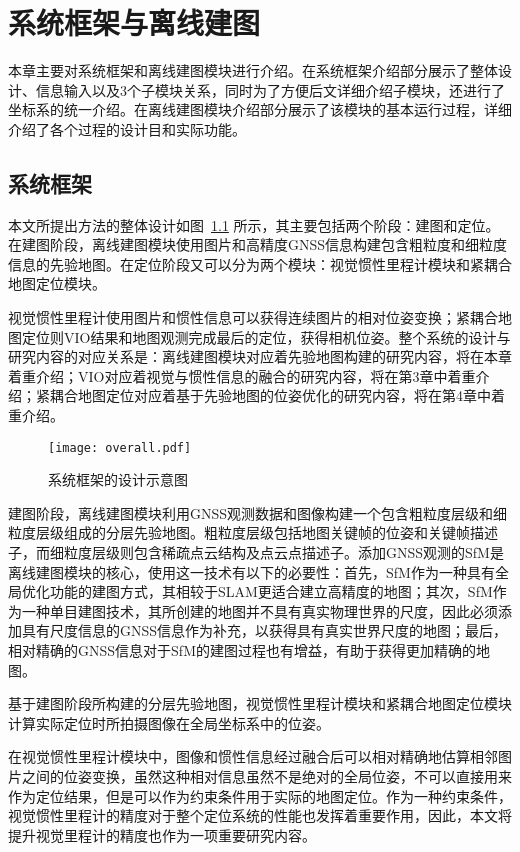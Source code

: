 
\chapter{系统框架与离线建图}

本章主要对系统框架和离线建图模块进行介绍。在系统框架介绍部分展示了整体设计、信息输入以及3个子模块关系，同时为了方便后文详细介绍子模块，还进行了坐标系的统一介绍。在离线建图模块介绍部分展示了该模块的基本运行过程，详细介绍了各个过程的设计目和实际功能。

\section{系统框架}

本文所提出方法的整体设计如图~\ref{fig:overall} 所示，其主要包括两个阶段：建图和定位。在建图阶段，离线建图模块使用图片和高精度GNSS信息构建包含粗粒度和细粒度信息的先验地图。在定位阶段又可以分为两个模块：视觉惯性里程计模块和紧耦合地图定位模块。

视觉惯性里程计使用图片和惯性信息可以获得连续图片的相对位姿变换；紧耦合地图定位则VIO结果和地图观测完成最后的定位，获得相机位姿。整个系统的设计与研究内容的对应关系是：离线建图模块对应着先验地图构建的研究内容，将在本章着重介绍；VIO对应着视觉与惯性信息的融合的研究内容，将在第3章中着重介绍；紧耦合地图定位对应着基于先验地图的位姿优化的研究内容，将在第4章中着重介绍。

\begin{figure}
  \centering
  \texttt{[image: overall.pdf]}
  \caption{系统框架的设计示意图}
  \label{fig:overall}
\end{figure}

建图阶段，离线建图模块利用GNSS观测数据和图像构建一个包含粗粒度层级和细粒度层级组成的分层先验地图。粗粒度层级包括地图关键帧的位姿和关键帧描述子，而细粒度层级则包含稀疏点云结构及点云点描述子。添加GNSS观测的SfM是离线建图模块的核心，使用这一技术有以下的必要性：首先，SfM作为一种具有全局优化功能的建图方式，其相较于SLAM更适合建立高精度的地图；其次，SfM作为一种单目建图技术，其所创建的地图并不具有真实物理世界的尺度，因此必须添加具有尺度信息的GNSS信息作为补充，以获得具有真实世界尺度的地图；最后，相对精确的GNSS信息对于SfM的建图过程也有增益，有助于获得更加精确的地图。

基于建图阶段所构建的分层先验地图，视觉惯性里程计模块和紧耦合地图定位模块计算实际定位时所拍摄图像在全局坐标系中的位姿。

在视觉惯性里程计模块中，图像和惯性信息经过融合后可以相对精确地估算相邻图片之间的位姿变换，虽然这种相对信息虽然不是绝对的全局位姿，不可以直接用来作为定位结果，但是可以作为约束条件用于实际的地图定位。作为一种约束条件，视觉惯性里程计的精度对于整个定位系统的性能也发挥着重要作用，因此，本文将提升视觉里程计的精度也作为一项重要研究内容。

